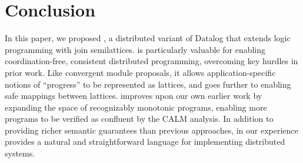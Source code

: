 \pagebreak
\section{Conclusion}
In this paper, we proposed \lang, a distributed variant of Datalog that extends
logic programming with join semilattices. \lang is particularly valuable for
enabling coordination-free, consistent distributed programming, overcoming key
hurdles in prior work.  Like convergent module proposals, it allows
application-specific notions of ``progress'' to be represented as lattices, and
goes further to enabling safe mappings between lattices.  \lang improves upon
our own earlier work by expanding the space of recognizably monotonic programs,
enabling more programs to be verified as confluent by the CALM analysis.  In
addition to providing richer semantic guarantees than previous approaches, in
our experience \lang provides a natural and straightforward language for
implementing distributed systems.

